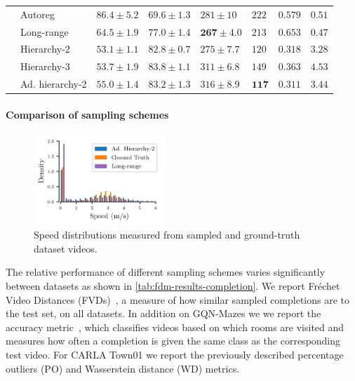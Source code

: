 \begin{table}
\begin{tabular}{llllllll}
    &  Autoreg        & $86.4 \pm 5.2$          & $69.6 \pm 1.3$   & $281 \pm 10$          & $222$          & $0.579$      & $0.51$     \\
    &  Long-range           & $64.5\pm1.9$            & $77.0 \pm 1.4$   & $\mathbf{267 \pm 4.0}$     & $213$          & $0.653$      & $\mathbf{0.47}$     \\
    &  Hierarchy-2          & $\mathbf{53.1 \pm 1.1}$ & $82.8 \pm 0.7$   & $275 \pm 7.7$        & $120$     & $0.318$  &  $3.28$      \\
    &  Hierarchy-3          & $53.7 \pm 1.9$          & $\mathbf{83.8 \pm 1.1}$   & $311 \pm 6.8$        & $149$      & $0.363$    &  $4.53$  \\
    &  Ad. hierarchy-2      & $55.0 \pm 1.4$          & $83.2 \pm 1.3$   & $316 \pm 8.9$    & $\mathbf{117}$          & $\mathbf{0.311}$     & $3.44$    \\
    \bottomrule
  \end{tabular}
\end{table}

\paragraph{Comparison of sampling schemes}
\begin{figure}
  \vspace{-.3cm}
  \begin{center}
    \includegraphics[width=0.44\textwidth]{figs/fdm/hist_new.pdf}
  \end{center}
  \caption{Speed distributions measured from sampled and ground-truth dataset videos.}
  \label{fig:hist}
\end{figure}
The relative performance of different sampling schemes varies significantly between datasets as shown in \cref{tab:fdm-results-completion}. We report Fréchet Video Distances (FVDs)~\cite{unterthiner2018towards}, a measure of how similar sampled completions are to the test set, on all datasets. In addition on GQN-Mazes we we report the accuracy metric~\cite{saxena2021clockwork}, which classifies videos based on which rooms are visited and measures how often a completion is given the same class as the corresponding test video. For CARLA Town01 we report the previously described percentage outliers (PO) and Wasserstein distance (WD) metrics. 

